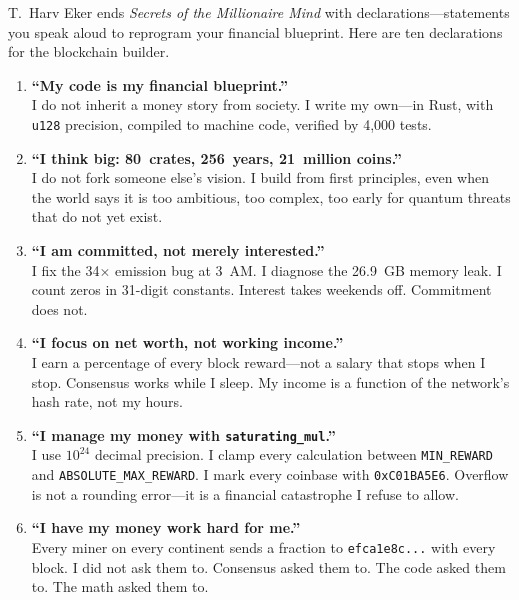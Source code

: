 \documentclass[11pt,a4paper]{article}
\begin{document}
T.~Harv Eker ends \emph{Secrets of the Millionaire Mind} with
declarations---statements you speak aloud to reprogram your financial
blueprint. Here are ten declarations for the blockchain builder.

\begin{declaration}[title={\textbf{The Quantum Millionaire's Ten Declarations}}]

\begin{enumerate}[leftmargin=2em, itemsep=0.6em]

\item \textbf{``My code is my financial blueprint.''}\\
I do not inherit a money story from society. I write my own---in Rust,
with \texttt{u128} precision, compiled to machine code, verified by
4{,}000 tests.

\item \textbf{``I think big: 80~crates, 256~years, 21~million coins.''}\\
I do not fork someone else's vision. I build from first principles,
even when the world says it is too ambitious, too complex, too early
for quantum threats that do not yet exist.

\item \textbf{``I am committed, not merely interested.''}\\
I fix the 34$\times$ emission bug at 3~AM. I diagnose the 26.9~GB
memory leak. I count zeros in 31-digit constants. Interest takes
weekends off. Commitment does not.

\item \textbf{``I focus on net worth, not working income.''}\\
I earn a percentage of every block reward---not a salary that stops
when I stop. Consensus works while I sleep. My income is a function
of the network's hash rate, not my hours.

\item \textbf{``I manage my money with \texttt{saturating\_mul}.''}\\
I use $10^{24}$ decimal precision. I clamp every calculation between
\texttt{MIN\_REWARD} and \texttt{ABSOLUTE\_MAX\_REWARD}. I mark every
coinbase with \texttt{0xC01BA5E6}. Overflow is not a rounding error---it
is a financial catastrophe I refuse to allow.

\item \textbf{``I have my money work hard for me.''}\\
Every miner on every continent sends a fraction to
\texttt{efca1e8c...} with every block. I did not ask them to. Consensus
asked them to. The code asked them to. The math asked them to.


\end{enumerate}
\end{declaration}
\end{document}
